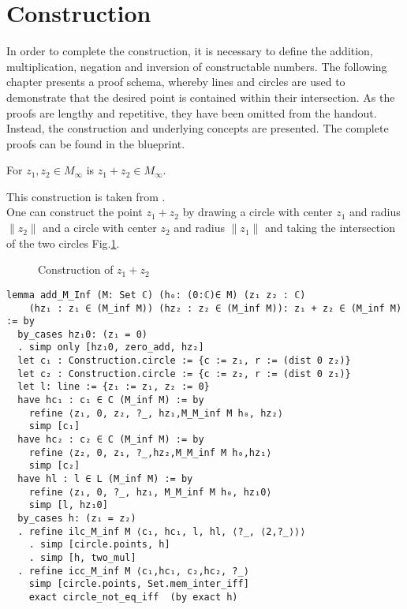 \section{Construction}
In order to complete the construction, it is necessary to define the addition, multiplication, negation and inversion of constructable numbers.
The following chapter presents a proof schema, whereby lines and circles are used to demonstrate that the desired point is contained within their intersection. As the proofs are lengthy and repetitive, they have been omitted from the handout. Instead, the construction and underlying concepts are presented.
The complete proofs can be found in the blueprint.

\begin{lemma}
    \label{lem:construction_add}
    For $z_1, z_2 \in M_{\infty}$ is $z_1 + z_2 \in M_{\infty}$.
\end{lemma}
This construction is taken from \cite{JAN_SCHROEER:2023}.\\
One can construct the point $z_1 + z_2$ by drawing a circle with center $z_1$ and radius $\|z_2\|$ and a circle with center $z_2$ and radius $\|z_1\|$ and taking the intersection of the two circles Fig.\ref{Fig.2}.

\begin{figure}[h!]
    \centering
    \caption{Construction of $z_1 + z_2$}
    \label{Fig.2}
\end{figure}

\begin{lstlisting}
lemma add_M_Inf (M: Set ℂ) (h₀: (0:ℂ)∈ M) (z₁ z₂ : ℂ)
    (hz₁ : z₁ ∈ (M_inf M)) (hz₂ : z₂ ∈ (M_inf M)): z₁ + z₂ ∈ (M_inf M) := by
  by_cases hz₁0: (z₁ = 0)
  . simp only [hz₁0, zero_add, hz₂]
  let c₁ : Construction.circle := {c := z₁, r := (dist 0 z₂)}
  let c₂ : Construction.circle := {c := z₂, r := (dist 0 z₁)}
  let l: line := {z₁ := z₁, z₂ := 0}
  have hc₁ : c₁ ∈ C (M_inf M) := by
    refine ⟨z₁, 0, z₂, ?_, hz₁,M_M_inf M h₀, hz₂⟩
    simp [c₁]
  have hc₂ : c₂ ∈ C (M_inf M) := by
    refine ⟨z₂, 0, z₁, ?_,hz₂,M_M_inf M h₀,hz₁⟩
    simp [c₂]
  have hl : l ∈ L (M_inf M) := by
    refine ⟨z₁, 0, ?_, hz₁, M_M_inf M h₀, hz₁0⟩
    simp [l, hz₁0]
  by_cases h: (z₁ = z₂)
  . refine ilc_M_inf M ⟨c₁, hc₁, l, hl, ⟨?_, ⟨2,?_⟩⟩⟩
    . simp [circle.points, h]
    . simp [h, two_mul]
  . refine icc_M_inf M ⟨c₁,hc₁, c₂,hc₂, ?_⟩
    simp [circle.points, Set.mem_inter_iff]
    exact circle_not_eq_iff  (by exact h)
\end{lstlisting}

